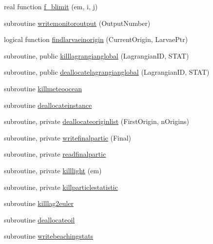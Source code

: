 \begin{DoxyCompactItemize}
\item 
real function \mbox{\hyperlink{namespacemodulelagrangianglobal_ae741ac31795a4ede3b77f20ffacd71c0}{f\+\_\+blimit}} (em, i, j)
\item 
subroutine \mbox{\hyperlink{namespacemodulelagrangianglobal_ab46abe813f09e4d8299d7750b21814d7}{writemonitoroutput}} (Output\+Number)
\item 
logical function \mbox{\hyperlink{namespacemodulelagrangianglobal_a0358a516f0009b4fbeb3513332511d63}{findlarvaeinorigin}} (Current\+Origin, Larvae\+Ptr)
\item 
subroutine, public \mbox{\hyperlink{namespacemodulelagrangianglobal_a0c95242d79d3bded29c18e1055a5a11d}{killlagrangianglobal}} (Lagrangian\+ID, S\+T\+AT)
\item 
subroutine, public \mbox{\hyperlink{namespacemodulelagrangianglobal_ad5b47824d7c52644996eed764c9ee9ae}{deallocatelagrangianglobal}} (Lagrangian\+ID, S\+T\+AT)
\item 
subroutine \mbox{\hyperlink{namespacemodulelagrangianglobal_a554a65c3f7ed6c27bff5e766338687d5}{killmeteoocean}}
\item 
subroutine \mbox{\hyperlink{namespacemodulelagrangianglobal_a8fa9aff34dfeede08953dd200b17e64b}{deallocateinstance}}
\item 
subroutine, private \mbox{\hyperlink{namespacemodulelagrangianglobal_a6e34918fa64284d7048a43df89293088}{deallocateoriginlist}} (First\+Origin, n\+Origins)
\item 
subroutine, private \mbox{\hyperlink{namespacemodulelagrangianglobal_a2bf7986f317831603f4eb96d616f643e}{writefinalpartic}} (Final)
\item 
subroutine, private \mbox{\hyperlink{namespacemodulelagrangianglobal_a101ffba4c1f5b064fc15cf4cd92df60e}{readfinalpartic}}
\item 
subroutine, private \mbox{\hyperlink{namespacemodulelagrangianglobal_ae738cd408e31ba7ac9158f7d3e11b53a}{killlight}} (em)
\item 
subroutine, private \mbox{\hyperlink{namespacemodulelagrangianglobal_a3ce834e6c05495002ac0eda8b4096d0e}{killparticlestatistic}}
\item 
subroutine \mbox{\hyperlink{namespacemodulelagrangianglobal_aebe9f7760ed357205d3844024707e233}{killlag2euler}}
\item 
subroutine \mbox{\hyperlink{namespacemodulelagrangianglobal_a09f60316f814ba83ce713d83c0cf67ef}{deallocateoil}}
\item 
subroutine \mbox{\hyperlink{namespacemodulelagrangianglobal_ab5538aa3df9f78e442a96f940f3d160f}{writebeachingstats}}

\end{DoxyCompactItemize}
